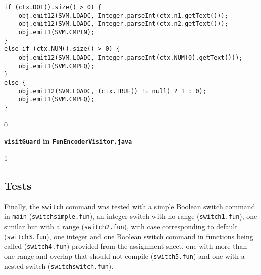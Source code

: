 \documentclass{article}
\newcommand{\code}[1]{\texttt{#1}}
\newenvironment{codelst}{\captionsetup{type=listing}}{}
\newcommand{\dividestages}{0}
\newcommand{\stage}[1]{
    \if\dividestages1
        \vspace{0.5cm}
        \subsection{#1}
    \fi
}
\newcommand{\codecaption}[1]{
    \if\dividestages0
        \vspace{-0.75cm}
        \caption{\textbf{#1}}
        \vspace{0.4cm}
    \fi
}
\begin{document}
\begin{codelst}
\begin{verbatim}
if (ctx.DOT().size() > 0) {
	obj.emit12(SVM.LOADC, Integer.parseInt(ctx.n1.getText()));
	obj.emit12(SVM.LOADC, Integer.parseInt(ctx.n2.getText()));
	obj.emit1(SVM.CMPIN);
}
else if (ctx.NUM().size() > 0) {
	obj.emit12(SVM.LOADC, Integer.parseInt(ctx.NUM(0).getText()));
	obj.emit1(SVM.CMPEQ);
}
else {
	obj.emit12(SVM.LOADC, (ctx.TRUE() != null) ? 1 : 0);
	obj.emit1(SVM.CMPEQ);
}
\end{verbatim}
\codecaption{\code{visitGuard} in \code{FunEncoderVisitor.java}}
\end{codelst}


\stage{Tests}

\vspace{0.5cm}

\noindent Finally, the \code{switch} command was tested with a simple Boolean switch command in \code{main} (\code{switchsimple.fun}), an integer switch with no range (\code{switch1.fun}), one similar but with a range (\code{switch2.fun}), with case corresponding to default (\code{switch3.fun}), one integer and one Boolean switch command in functions being called (\code{switch4.fun}) provided from the assignment sheet, one with more than one range and overlap that should not compile (\code{switch5.fun}) and one with a nested switch (\code{switchswitch.fun}).

\fi


\end{document}
